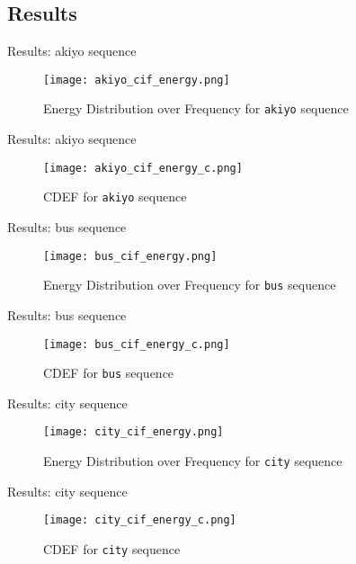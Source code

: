 \documentclass{beamer}
\begin{document}
\subsection{Results}
\begin{frame}{Results: akiyo sequence}
\begin{figure}
\centering
\texttt{[image: akiyo\_cif\_energy.png]}
\caption{Energy Distribution over Frequency for {\tt akiyo} sequence}
\label{akiyo_energy}
\end{figure}
\end{frame}

\begin{frame}{Results: akiyo sequence}
\begin{figure}
\centering
\texttt{[image: akiyo\_cif\_energy\_c.png]}
\caption{CDEF for {\tt akiyo} sequence}
\label{akiyo_energy}
\end{figure}
\end{frame}

\begin{frame}{Results: bus sequence}
\begin{figure}
\centering
\texttt{[image: bus\_cif\_energy.png]}
\caption{Energy Distribution over Frequency for {\tt bus} sequence}
\label{bus_energy}
\end{figure}
\end{frame}

\begin{frame}{Results: bus sequence}
\begin{figure}
\centering
\texttt{[image: bus\_cif\_energy\_c.png]}
\caption{CDEF for {\tt bus} sequence}
\label{bus_energy}
\end{figure}
\end{frame}

\begin{frame}{Results: city sequence}
\begin{figure}
\centering
\texttt{[image: city\_cif\_energy.png]}
\caption{Energy Distribution over Frequency for {\tt city} sequence}
\label{city_energy}
\end{figure}
\end{frame}

\begin{frame}{Results: city sequence}
\begin{figure}
\centering
\texttt{[image: city\_cif\_energy\_c.png]}
\caption{CDEF for {\tt city} sequence}
\label{city_energy}
\end{figure}
\end{frame}
\end{document}
